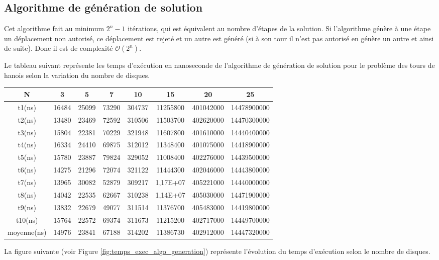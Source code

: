 \subsection{Algorithme de génération de solution}
Cet algorithme fait au minimum $2^{n} - 1$ itérations, qui est équivalent au nombre d'étapes de la solution. Si l'algorithme génère à une étape un déplacement non autorisé, ce déplacement est rejeté et un autre est généré (si à son tour il n'est pas autorisé en génère un autre et ainsi de suite). Donc il est de complexité $\mathcal{O}(2^{n})$.
\par
Le tableau suivant représente les temps d'exécution en nanoseconde de l'algorithme de génération de solution pour le problème des tours de hanois selon la variation du nombre de disques.\\
\small
\begin{center}
    \begin{tabular}{| c | c | c | c | c | c | c | c |}
        \hline
        N & 3 & 5 & 7 & 10 & 15 & 20 & 25\\
        \hline
        t1(ns) & 16484 & 25099 & 73290 & 304737 & 11255800 & 401042000 & 14478900000\\
        \hline
        t2(ns) & 13480 & 23469 & 72592 & 310506 & 11503700 & 402620000 & 14470300000\\
        \hline
        t3(ns) & 15804 & 22381 & 70229 & 321948 & 11607800 & 401610000 & 14440400000\\
        \hline
        t4(ns) & 16334 & 24410 & 69875 & 312012 & 11348400 & 401075000 & 14418900000\\
        \hline
        t5(ns) & 15780 & 23887 & 79824 & 329052 & 11008400 & 402276000 & 14439500000\\
        \hline
        t6(ns) & 14275 & 21296 & 72074 & 321122 & 11444300 & 402046000 & 14443800000\\
        \hline
        t7(ns) & 13965 & 30082 & 52879 & 309217 & 1,17E+07 & 405221000 & 14440000000\\
        \hline
        t8(ns) & 14042 & 22535 & 62667 & 310238 & 1,14E+07 & 405030000 & 14471900000\\
        \hline
        t9(ns) & 13832 & 22679 & 49077 & 311514 & 11376700 & 405483000 & 14419800000\\
        \hline
        t10(ns) & 15764 & 22572 & 69374 & 311673 & 11215200 & 402717000 & 14449700000\\
        \hline
        moyenne(ns) & 14976 & 23841 & 67188 & 314202 & 11386730 & 402912000 & 14447320000\\
        \hline
    \end{tabular}
\end{center}
\normalsize
\par
La figure suivante (voir Figure \ref{fig:temps_exec_algo_generation}) représente l'évolution du temps d'exécution selon le nombre de disques.

